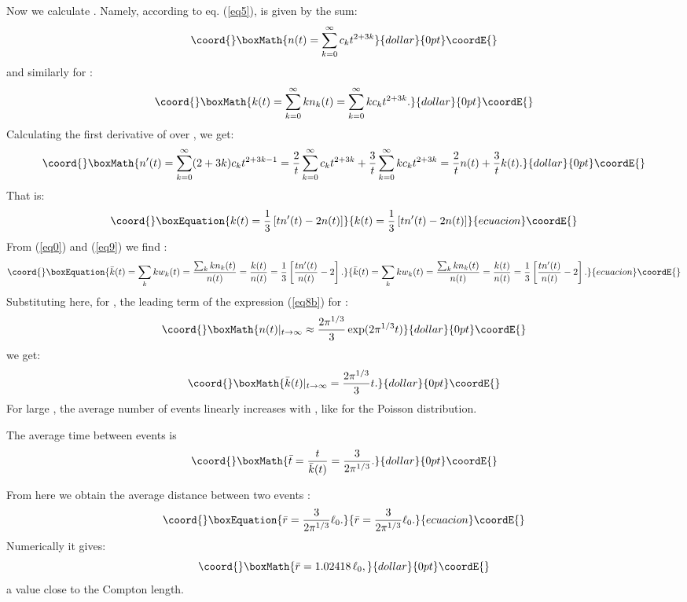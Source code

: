 \documentclass[a4paper,12pt]{article}
\begin{document}
Now we calculate \coordHE{}.
Namely, according to eq. (\ref{eq5}), \coordHE{} is given by the sum:
$$\coord{}\boxMath{
n(t)= \sum_{k=0}^{\infty}  c_{k} t^{2+3k}
}{dollar}{0pt}\coordE{}$$
and similarly for \coordHE{}:
$$\coord{}\boxMath{
k(t)=\sum_{k=0}^{\infty}  k n_k(t)=\sum_{k=0}^{\infty} k c_{k} t^{2+3k}.
}{dollar}{0pt}\coordE{}$$
Calculating the first derivative of \coordHE{} over \coordHE{}, we get:
$$\coord{}\boxMath{
n'(t)= \sum_{k=0}^{\infty} (2+3k) c_{k} t^{2+3k-1}=
\frac{2}{t}\sum_{k=0}^{\infty} c_{k}  t^{2+3k}
+\frac{3}{t}\sum_{k=0}^{\infty} k c_{k} t^{2+3k}
=\frac{2}{t}n(t)+\frac{3}{t}k(t).
}{dollar}{0pt}\coordE{}$$
That is:
\begin{equation}\coord{}\boxEquation{\label{eq9}
k(t)=\frac{1}{3}\left[t n'(t)-2n(t)\right]
}{k(t)=\frac{1}{3}\left[t n'(t)-2n(t)\right]
}{ecuacion}\coordE{}\end{equation}
    From (\ref{eq0}) and (\ref{eq9}) we find \coordHE{}:
\begin{equation}\coord{}\boxEquation{\label{eq10}
\bar{k}(t)=\sum_k k w_k(t)=\frac{\sum_k k n_k(t)}{n(t)}=
\frac{k(t)}{n(t)}=\frac{1}{3}\left[\frac{t n'(t)}{n(t)}-2\right].
}{\bar{k}(t)=\sum_k k w_k(t)=\frac{\sum_k k n_k(t)}{n(t)}=
\frac{k(t)}{n(t)}=\frac{1}{3}\left[\frac{t n'(t)}{n(t)}-2\right].
}{ecuacion}\coordE{}\end{equation}
Substituting here, for \coordHE{}, the leading term of the
expression (\ref{eq8b}) for \coordHE{}:
$$\coord{}\boxMath{
n(t)|_{t\to\infty}\approx\frac{2\pi^{1/3}}{3}\exp(2 \pi^{1/3} t)
}{dollar}{0pt}\coordE{}$$
we get:
$$\coord{}\boxMath{
\bar{k}(t)|_{t\to\infty}=\frac{2\pi^{1/3}}{3}t.
}{dollar}{0pt}\coordE{}$$
For large \coordHE{},  the average number of events linearly increases
with \coordHE{}, like for the Poisson distribution.

The average time between events is
$$\coord{}\boxMath{
\bar{t}=\frac{t}{\bar{k}(t)}=\frac{3}{2\pi^{1/3}}.
}{dollar}{0pt}\coordE{}$$

    From here we obtain the average distance between two events
\coordHE{}:
\begin{equation}\coord{}\boxEquation{\label{eq11}
\bar{r}=\frac{3}{2\pi^{1/3}} \ell_0.
}{\bar{r}=\frac{3}{2\pi^{1/3}} \ell_0.
}{ecuacion}\coordE{}\end{equation}
Numerically it gives:
$$\coord{}\boxMath{
\bar{r}=1.02418 \,\ell_0,
}{dollar}{0pt}\coordE{}$$
a value close to the Compton length.
\end{document}
